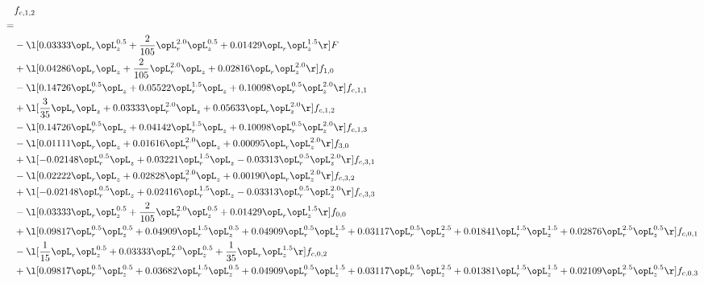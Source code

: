 \begin{alignat}{2} 
\label{eq:f_12_1} 
& f_{c,1,2} \nonumber \\ 
 = \\ 
& - \l[  0.03333 \opL_r \opL_z^{0.5} + \frac{2}{105} \opL_r^{2.0} \opL_z^{0.5} +  0.01429 \opL_r \opL_z^{1.5}  \r] F \nonumber \\ 
& + \l[  0.04286 \opL_r \opL_z + \frac{2}{105} \opL_r^{2.0} \opL_z +  0.02816 \opL_r \opL_z^{2.0}  \r] f_{1,0} \nonumber \\ 
& - \l[  0.14726 \opL_r^{0.5} \opL_z +  0.05522 \opL_r^{1.5} \opL_z +  0.10098 \opL_r^{0.5} \opL_z^{2.0}  \r] f_{c,1,1} \nonumber \\ 
& + \l[ \frac{3}{35} \opL_r \opL_z +  0.03333 \opL_r^{2.0} \opL_z +  0.05633 \opL_r \opL_z^{2.0}  \r] f_{c,1,2} \nonumber \\ 
& - \l[  0.14726 \opL_r^{0.5} \opL_z +  0.04142 \opL_r^{1.5} \opL_z +  0.10098 \opL_r^{0.5} \opL_z^{2.0}  \r] f_{c,1,3} \nonumber \\ 
& - \l[  0.01111 \opL_r \opL_z +  0.01616 \opL_r^{2.0} \opL_z +  0.00095 \opL_r \opL_z^{2.0}  \r] f_{3,0} \nonumber \\ 
& + \l[  -0.02148 \opL_r^{0.5} \opL_z +  0.03221 \opL_r^{1.5} \opL_z   -0.03313 \opL_r^{0.5} \opL_z^{2.0}  \r] f_{c,3,1} \nonumber \\ 
& - \l[  0.02222 \opL_r \opL_z +  0.02828 \opL_r^{2.0} \opL_z +  0.00190 \opL_r \opL_z^{2.0}  \r] f_{c,3,2} \nonumber \\ 
& + \l[  -0.02148 \opL_r^{0.5} \opL_z +  0.02416 \opL_r^{1.5} \opL_z   -0.03313 \opL_r^{0.5} \opL_z^{2.0}  \r] f_{c,3,3} \nonumber \\ 
& - \l[  0.03333 \opL_r \opL_z^{0.5} + \frac{2}{105} \opL_r^{2.0} \opL_z^{0.5} +  0.01429 \opL_r \opL_z^{1.5}  \r] f_{0,0} \nonumber \\ 
& + \l[  0.09817 \opL_r^{0.5} \opL_z^{0.5} +  0.04909 \opL_r^{1.5} \opL_z^{0.5} +  0.04909 \opL_r^{0.5} \opL_z^{1.5} +  0.03117 \opL_r^{0.5} \opL_z^{2.5} +  0.01841 \opL_r^{1.5} \opL_z^{1.5} +  0.02876 \opL_r^{2.5} \opL_z^{0.5}  \r] f_{c,0,1} \nonumber \\ 
& - \l[ \frac{1}{15} \opL_r \opL_z^{0.5} +  0.03333 \opL_r^{2.0} \opL_z^{0.5} + \frac{1}{35} \opL_r \opL_z^{1.5}  \r] f_{c,0,2} \nonumber \\ 
& + \l[  0.09817 \opL_r^{0.5} \opL_z^{0.5} +  0.03682 \opL_r^{1.5} \opL_z^{0.5} +  0.04909 \opL_r^{0.5} \opL_z^{1.5} +  0.03117 \opL_r^{0.5} \opL_z^{2.5} +  0.01381 \opL_r^{1.5} \opL_z^{1.5} +  0.02109 \opL_r^{2.5} \opL_z^{0.5}  \r] f_{c,0,3} \nonumber \\ 

\end{alignat}

